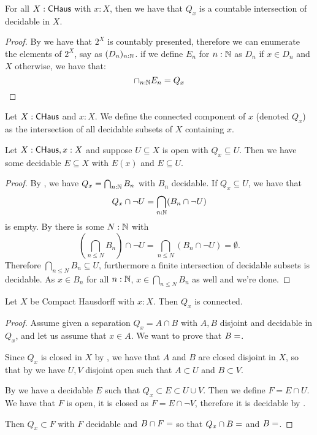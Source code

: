 \begin{lemma}\label{ConnectedComponentClosedInCompactHausdorff}
For all $X:\mathsf{CHaus}$ with $x:X$, then we have that $Q_x$ is a countable intersection of decidable in $X$.
\end{lemma}

\begin{proof}
By  we have that $2^X$ is countably presented, therefore we can enumerate the elements of $2^X$, say as $(D_n)_{n:\mathbb{N}}$. if we define $E_n$ for $n:\mathbb{N}$ as $D_n$ if $x\in D_n$ and $X$ otherwise, we have that:
$$\cap_{n:\mathbb{N}}E_n = Q_x$$
\end{proof}

\begin{definition}
  Let $X:\mathsf{CHaus}$ and $x:X$. 
  We define the connected component of $x$ (denoted $Q_x$)
  as the intersection of all decidable subsets of $X$ containing $x$. 
\end{definition}

\begin{lemma}\label{ConnectedComponentSubOpenHasDecidableInbetween}
  Let $X:\mathsf{CHaus}, x:X$ and suppose $U\subseteq X$ is open with $Q_x\subseteq U$. 
  Then we have some decidable $E\subseteq X$ with $E(x)$ and $E\subseteq U$. 
\end{lemma}
\begin{proof}
  By , we have $Q_x = \bigcap_{n:\mathbb{N}}B_n$ with $B_n$ decidable. 
  If $Q_x \subseteq U$, we have that 
  $$Q_x\cap \neg U = \bigcap_{n:\mathbb{N}} (B_n \cap \neg U)$$ is empty. 
  By  there is some $N:\mathbb{N}$ with 
  $$(\bigcap_{n\leq N} B_n )\cap \neg U  = \bigcap_{n\leq N} (B_n \cap \neg U) = \emptyset.$$
  Therefore $\bigcap_{n\leq N} B_n \subseteq U$, furthermore a finite intersection of decidable subsets is decidable. 
  As $x\in B_n$ for all $n:\mathbb{N}$, $x\in \bigcap_{n\leq N} B_n$ as well and we're done. 
\end{proof}

\begin{lemma}\label{ConnectedComponentConnected}
Let $X$ be Compact Hausdorff with $x:X$. Then $Q_x$ is connected.
\end{lemma}
\begin{proof}
Assume given a separation $Q_x = A\cap B$ with $A,B$ disjoint and decidable in $Q_x$, and let us assume that $x\in A$. We want to prove that $B=\empty$. 

Since $Q_x$ is closed in $X$ by , we have that $A$ and $B$ are closed disjoint in $X$, so that by  we have $U,V$ disjoint open such that $A\subset U$ and $B\subset V$. 

By  we have a decidable $E$ such that $Q_x\subset E\subset U\cup V$. Then we define $F = E\cap U$. We have that $F$ is open, it is closed as $F=E\cap \neg V$, therefore it is decidable by .

Then $Q_x\subset F$ with $F$ decidable and $B\cap F = \empty$ so that $Q_x\cap B = \empty$ and $B=\empty$.
\end{proof}

